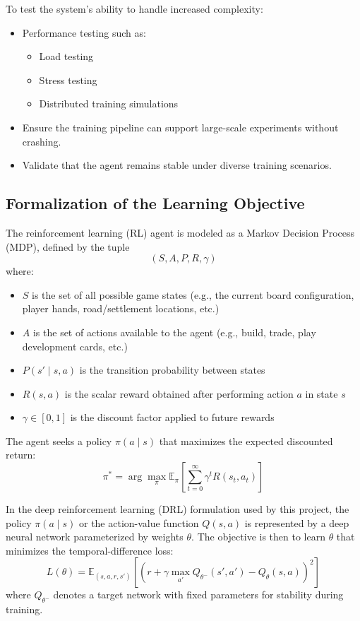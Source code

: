 \documentclass{article}
\begin{document}
To test the system’s ability to handle increased complexity:
\begin{itemize}
    \item Performance testing such as:
    \begin{itemize}
        \item Load testing
        \item Stress testing
        \item Distributed training simulations
    \end{itemize}
    \item Ensure the training pipeline can support large-scale experiments without crashing.
    \item Validate that the agent remains stable under diverse training scenarios.
\end{itemize}

\subsection{Formalization of the Learning Objective}
\label{sec:formalization}

The reinforcement learning (RL) agent is modeled as a Markov Decision Process (MDP), defined by the tuple
\[
(S, A, P, R, \gamma)
\]
where:
\begin{itemize}
    \item $S$ is the set of all possible game states (e.g., the current board configuration, player hands, road/settlement locations, etc.)
    \item $A$ is the set of actions available to the agent (e.g., build, trade, play development cards, etc.)
    \item $P(s' \mid s, a)$ is the transition probability between states
    \item $R(s, a)$ is the scalar reward obtained after performing action $a$ in state $s$
    \item $\gamma \in [0, 1]$ is the discount factor applied to future rewards
\end{itemize}

The agent seeks a policy $\pi(a \mid s)$ that maximizes the expected discounted return:
\[
\pi^* = \arg\max_{\pi} \mathbb{E}_{\pi}\left[\sum_{t=0}^{\infty} \gamma^t R(s_t, a_t)\right]
\]

In the deep reinforcement learning (DRL) formulation used by this project, the policy $\pi(a \mid s)$ or the action-value function $Q(s, a)$ is represented by a deep neural network parameterized by weights $\theta$. The objective is then to learn $\theta$ that minimizes the temporal-difference loss:
\[
L(\theta) = \mathbb{E}_{(s, a, r, s')} \left[ \left( r + \gamma \max_{a'} Q_{\theta^-}(s', a') - Q_{\theta}(s, a) \right)^2 \right]
\]
where $Q_{\theta^-}$ denotes a target network with fixed parameters for stability during training.
\end{document}
